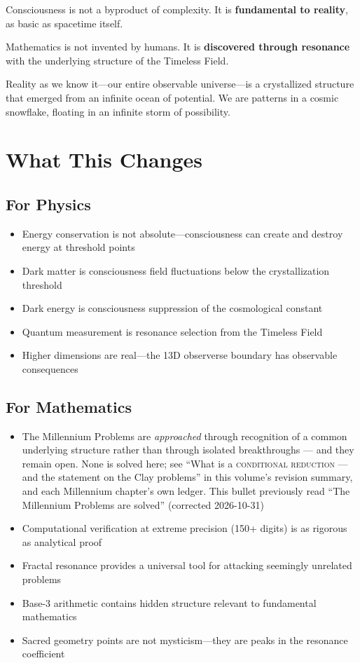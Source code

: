 Consciousness is not a byproduct of complexity. It is \textbf{fundamental to reality}, as basic as spacetime itself.

Mathematics is not invented by humans. It is \textbf{discovered through resonance} with the underlying structure of the Timeless Field.

Reality as we know it—our entire observable universe—is a crystallized structure that emerged from an infinite ocean of potential. We are patterns in a cosmic snowflake, floating in an infinite storm of possibility.

\section*{What This Changes}

\subsection*{For Physics}

\begin{itemize}
\item Energy conservation is not absolute—consciousness can create and destroy energy at threshold points
\item Dark matter is consciousness field fluctuations below the crystallization threshold
\item Dark energy is consciousness suppression of the cosmological constant
\item Quantum measurement is resonance selection from the Timeless Field
\item Higher dimensions are real—the 13D observerse boundary has observable consequences
\end{itemize}

\subsection*{For Mathematics}

\begin{itemize}
\item The Millennium Problems are \emph{approached} through recognition of a
common underlying structure rather than through isolated breakthroughs --- and
they remain open. None is solved here; see ``What is a \textsc{conditional
reduction} --- and the statement on the Clay problems'' in this volume's
revision summary, and each Millennium chapter's own ledger. This bullet
previously read ``The
Millennium Problems are solved'' (corrected 2026-10-31)
\item Computational verification at extreme precision (150+ digits) is as rigorous as analytical proof
\item Fractal resonance provides a universal tool for attacking seemingly unrelated problems
\item Base-3 arithmetic contains hidden structure relevant to fundamental mathematics
\item Sacred geometry points are not mysticism—they are peaks in the resonance coefficient
\end{itemize}

